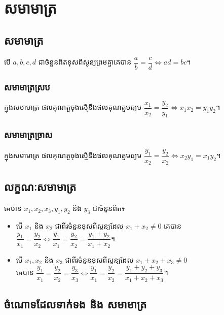 \chapter{សមាមាត្រ}
	
\section{សមាមាត្រ}
\begin{definition}
បើ $a,b,c,d$ ជាចំនួនពិតខុសពីសូន្យព្រមគ្នាគេបាន $\dfrac{a}{b}=\dfrac{c}{d}\Leftrightarrow ad=bc$។
\end{definition}
\subsection{សមាមាត្រស្រប}
\begin{definition}
ក្នុងសមាមាត្រ ផលគុណតួចុងស្មើនឹងផលគុណតួមធ្យម $\dfrac{x_1}{x_2}=\dfrac{y_2}{y_1}\Leftrightarrow x_1x_2=y_1y_2$។
\end{definition}
\subsection{សមាមាត្រច្រាស}
\begin{definition}
ក្នុងសមាមាត្រ ផលគុណតួចុងស្មើនឹងផលគុណតួមធ្យម $\dfrac{y_1}{x_2}=\dfrac{y_2}{x_2}\Leftrightarrow x_2y_1=x_1y_2$។
\end{definition}
\section{លក្ខណៈសមាមាត្រ}
\begin{definition}
គេមាន $x_1,x_2,x_3,y_1,y_2$ និង $y_3$ ជាចំនួនពិត៖
\begin{itemize}
\item បើ $x_1$ និង $x_2$ ជាពីរចំនួនខុសពីសូន្យដែល $x_1+x_2\ne 0$ គេបាន $\dfrac{y_1}{x_1}=\dfrac{y_2}{x_2}\Leftrightarrow \dfrac{y_1}{x_1}=\dfrac{y_2}{x_2}=\dfrac{y_1+y_2}{x_1+x_2}$។
\item បើ $x_1,x_2$ និង $x_3$ ជាពីរចំនួនខុសពីសូន្យដែល $x_1+x_2+x_3\ne 0$ \\គេបាន $\dfrac{y_1}{x_1}=\dfrac{y_2}{x_2}=\dfrac{y_3}{x_3}\Leftrightarrow \dfrac{y_1}{x_1}=\dfrac{y_2}{x_2}=\dfrac{y_1+y_2+y_3}{x_1+x_2+x_3}$។
\end{itemize}
\end{definition}
\section{ចំណោទដែលទាក់ទង និង សមាមាត្រ}
